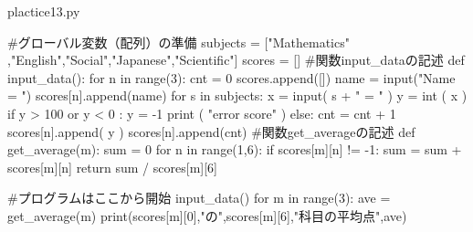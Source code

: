 \documentclass[11pt,a4paper,dvipdfmx,titlepage]{jsreport}
\begin{document}
\begin{ansbox}{plactice13.py}
\begin{listing}{1}
#グローバル変数（配列）の準備
subjects = ["Mathematics" ,"English","Social","Japanese","Scientific"]
scores = []
#関数input_dataの記述
def input_data():
    for n in range(3):
        cnt = 0
        scores.append([])
        name = input("Name = ")
        scores[n].append(name)
        for s in subjects:
            x = input( s + " = " )
            y = int ( x )
            if y > 100 or y < 0 :
                y = -1
                print ( "error score" )
            else:
                cnt = cnt + 1
            scores[n].append( y )
        scores[n].append(cnt)
#関数get_averageの記述
def get_average(m):
    sum = 0
    for n in range(1,6):
        if scores[m][n] != -1:
            sum = sum + scores[m][n]
    return sum / scores[m][6]

#プログラムはここから開始
input_data()
for m in range(3):
    ave = get_average(m)
    print(scores[m][0],"の",scores[m][6],"科目の平均点",ave)
\end{listing}
\end{ansbox}
\end{document}
